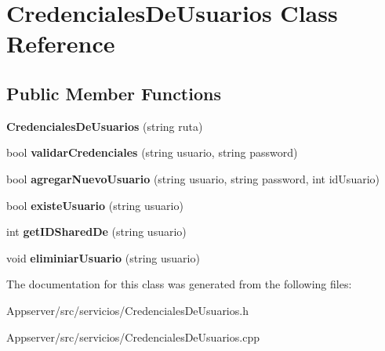 \hypertarget{classCredencialesDeUsuarios}{}\section{Credenciales\+De\+Usuarios Class Reference}
\label{classCredencialesDeUsuarios}
\subsection*{Public Member Functions}
\begin{DoxyCompactItemize}
\item 
{\bfseries Credenciales\+De\+Usuarios} (string ruta)\hypertarget{classCredencialesDeUsuarios_a15b7a889687dc843bd14f898d77ce08c}{}\label{classCredencialesDeUsuarios_a15b7a889687dc843bd14f898d77ce08c}

\item 
bool {\bfseries validar\+Credenciales} (string usuario, string password)\hypertarget{classCredencialesDeUsuarios_aaebcd26aecf776d7ed0db42a6afb7a5f}{}\label{classCredencialesDeUsuarios_aaebcd26aecf776d7ed0db42a6afb7a5f}

\item 
bool {\bfseries agregar\+Nuevo\+Usuario} (string usuario, string password, int id\+Usuario)\hypertarget{classCredencialesDeUsuarios_ab4602ff8edf46aecf52aa7063874eb6a}{}\label{classCredencialesDeUsuarios_ab4602ff8edf46aecf52aa7063874eb6a}

\item 
bool {\bfseries existe\+Usuario} (string usuario)\hypertarget{classCredencialesDeUsuarios_a0ceb2bbaf06917e3f9335f212cf8dc82}{}\label{classCredencialesDeUsuarios_a0ceb2bbaf06917e3f9335f212cf8dc82}

\item 
int {\bfseries get\+I\+D\+Shared\+De} (string usuario)\hypertarget{classCredencialesDeUsuarios_aa495a2cc2e0d3bb9015c9ef2443372d8}{}\label{classCredencialesDeUsuarios_aa495a2cc2e0d3bb9015c9ef2443372d8}

\item 
void {\bfseries eliminiar\+Usuario} (string usuario)\hypertarget{classCredencialesDeUsuarios_aa033613566beb441972f09f502178f4f}{}\label{classCredencialesDeUsuarios_aa033613566beb441972f09f502178f4f}

\end{DoxyCompactItemize}


The documentation for this class was generated from the following files\+:\begin{DoxyCompactItemize}
\item 
Appserver/src/servicios/Credenciales\+De\+Usuarios.\+h\item 
Appserver/src/servicios/Credenciales\+De\+Usuarios.\+cpp\end{DoxyCompactItemize}
